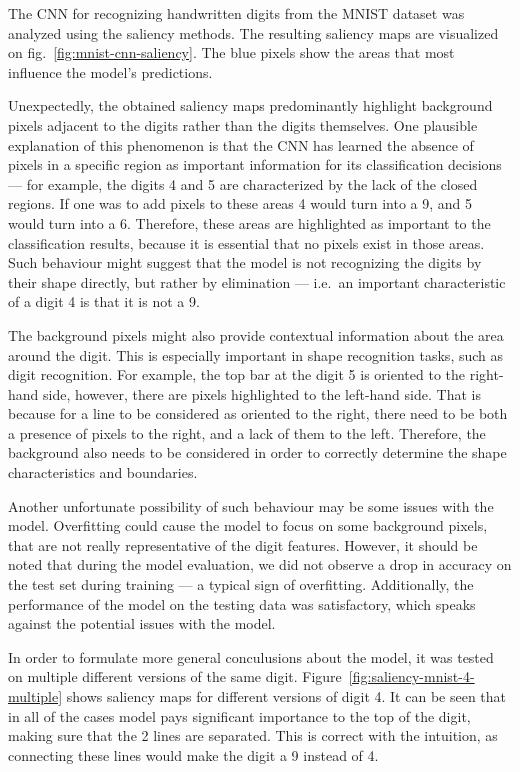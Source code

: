 \documentclass[journal, a4paper]{IEEEtran}
\begin{document}
The CNN for recognizing handwritten digits from the MNIST dataset was analyzed using the saliency methods.
The resulting saliency maps are visualized on fig.~\ref{fig:mnist-cnn-saliency}.
The blue pixels show the areas that most influence the model's predictions.

Unexpectedly, the obtained saliency maps predominantly highlight background pixels adjacent to the digits
rather than the digits themselves.
One plausible explanation of this phenomenon is that the CNN has learned the absence of pixels in a specific region as
important information for its classification decisions --- for example, the digits 4 and 5 are characterized by the lack of the closed regions.
If one was to add pixels to these areas 4 would turn into a 9, and 5 would turn into a 6.
Therefore, these areas are highlighted as important to the classification results, because it is essential that no pixels exist in those areas.
Such behaviour might suggest that the model is not recognizing the digits by their shape directly, but rather by elimination --- i.e.\ an important characteristic of a digit 4 is that it is not a 9.

The background pixels might also provide contextual information about the area around the digit.
This is especially important in shape recognition tasks, such as digit recognition.
For example, the top bar at the digit 5 is oriented to the right-hand side, however, there are pixels highlighted to the left-hand side.
That is because for a line to be considered as oriented to the right, there need to be both a presence of pixels to the right, and a lack of them to the left.
Therefore, the background also needs to be considered in order to correctly determine the shape characteristics and boundaries.

Another unfortunate possibility of such behaviour may be some issues with the model.
Overfitting could cause the model to focus on some background pixels, that are not really representative of the digit features.
However, it should be noted that during the model evaluation, we did not observe a drop in accuracy on the test set during training --- a typical sign of overfitting.
Additionally, the performance of the model on the testing data was satisfactory, which speaks against the potential issues with the model.

In order to formulate more general conculusions about the model, it was tested on multiple different versions of the same digit.
Figure~\ref{fig:saliency-mnist-4-multiple} shows saliency maps for different versions of digit 4.
It can be seen that in all of the cases model pays significant importance to the top of the digit, making sure that the 2 lines are separated.
This is correct with the intuition, as connecting these lines would make the digit a 9 instead of 4.
\end{document}
